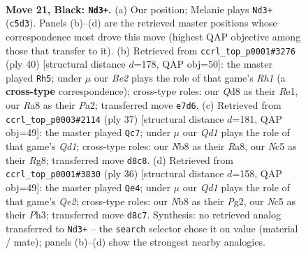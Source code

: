 \documentclass[11pt]{article}
\begin{document}
\clearpage

\begin{figure}[p]\centering
\begin{subfigure}{0.46\textwidth}\centering
\resizebox{\linewidth}{!}{%
\newchessgame
\chessboard[
  setfen={rn1qk3/p2bbr2/1p4Q1/1BnpN1P1/P7/2N5/1P3P2/R1B1K2R b KQ - 2 21},
  showmover=false,
  pgfstyle=straightmove, color=movearrow, markmove={c5-d3}
]}
\caption{}
\end{subfigure}\hfill
\begin{subfigure}{0.46\textwidth}\centering
\resizebox{\linewidth}{!}{%
\newchessgame
\chessboard[
  setfen={r1bk1r2/ppp3b1/3p3p/3Pq3/2PnN3/3Q1B2/P4PP1/4RKNR w - - 4 21},
  showmover=false,
  pgfstyle=straightmove, color=movearrow, markmove={h1-h5}
]}
\caption{}
\end{subfigure}
\\[4pt]
\begin{subfigure}{0.46\textwidth}\centering
\resizebox{\linewidth}{!}{%
\newchessgame
\chessboard[
  setfen={r2qk1r1/pb3p2/3bp2p/4B2Q/NpBRn2P/8/PP3PP1/4K2R b Kq - 0 19},
  showmover=false,
  pgfstyle=straightmove, color=movearrow, markmove={d8-c7}
]}
\caption{}
\end{subfigure}\hfill
\begin{subfigure}{0.46\textwidth}\centering
\resizebox{\linewidth}{!}{%
\newchessgame
\chessboard[
  setfen={rnb2k1r/pp2bppp/2pN4/3nP3/P2N4/1R5P/q2BQ1P1/4KB1R w K - 4 19},
  showmover=false,
  pgfstyle=straightmove, color=movearrow, markmove={e2-e4}
]}
\caption{}
\end{subfigure}
\caption{\textbf{Move 21, Black: \texttt{Nd3+}.} (a) Our position; Melanie plays \texttt{Nd3+} (\texttt{c5d3}). Panels (b)--(d) are the retrieved master positions whose correspondence most drove this move (highest QAP objective among those that transfer to it). (b) Retrieved from \texttt{ccrl\_top\_p0001\#3276} (ply 40) [structural distance $d$=178, QAP obj=50]: the master played \texttt{Rh5}; under $\mu$ our \emph{Be2} plays the role of that game's \emph{Rh1} (a \textbf{cross-type} correspondence); cross-type roles: our \emph{Q}d8 as their \emph{R}e1, our \emph{R}a8 as their \emph{P}a2; transferred move \texttt{e7d6}. (c) Retrieved from \texttt{ccrl\_top\_p0003\#2114} (ply 37) [structural distance $d$=181, QAP obj=49]: the master played \texttt{Qc7}; under $\mu$ our \emph{Qd1} plays the role of that game's \emph{Qd1}; cross-type roles: our \emph{N}b8 as their \emph{R}a8, our \emph{N}c5 as their \emph{R}g8; transferred move \texttt{d8c8}. (d) Retrieved from \texttt{ccrl\_top\_p0001\#3830} (ply 36) [structural distance $d$=158, QAP obj=49]: the master played \texttt{Qe4}; under $\mu$ our \emph{Qd1} plays the role of that game's \emph{Qe2}; cross-type roles: our \emph{N}b8 as their \emph{P}g2, our \emph{N}c5 as their \emph{P}h3; transferred move \texttt{d8c7}. Synthesis: no retrieved analog transferred to \texttt{Nd3+} -- the \texttt{search} selector chose it on value (material / mate); panels (b)--(d) show the strongest nearby analogies.}
\label{fig:thought-m41}
\end{figure}
\end{document}

